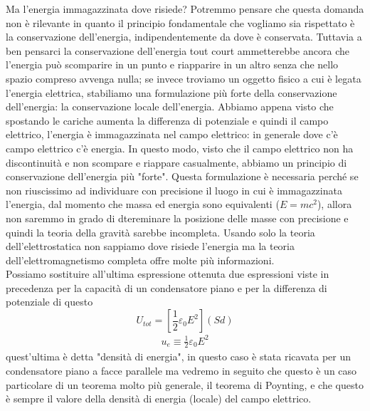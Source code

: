 \documentclass[
10pt, %
a4paper, %
oneside, %
headinclude,footinclude, %
BCOR5mm, %
]{scrartcl}
\begin{document}
Ma l'energia immagazzinata dove risiede? Potremmo pensare che questa domanda non è rilevante in quanto il principio fondamentale che vogliamo sia rispettato è la conservazione dell'energia, indipendentemente da dove è conservata. Tuttavia a ben pensarci la conservazione dell'energia tout court ammetterebbe ancora che l'energia può scomparire in un punto e riapparire in un altro senza che nello spazio compreso avvenga nulla; se invece troviamo un oggetto fisico a cui è legata l'energia elettrica, stabiliamo una formulazione più forte della conservazione dell'energia: la conservazione locale dell'energia. Abbiamo appena visto che spostando le cariche aumenta la differenza di potenziale e quindi il campo elettrico, l'energia è immagazzinata nel campo elettrico: in generale dove c'è campo elettrico c'è energia. In questo modo, visto che il campo elettrico non ha discontinuità e non scompare e riappare casualmente, abbiamo un principio di conservazione dell'energia più "forte". Questa formulazione è necessaria perché se non riuscissimo ad individuare con precisione il luogo in cui è immagazzinata l'energia, dal momento che massa ed energia sono equivalenti (\(E = mc^2\)), allora non saremmo in grado di dtereminare la posizione delle masse con precisione e quindi la teoria della gravità sarebbe incompleta. Usando solo la teoria dell'elettrostatica non sappiamo dove risiede l'energia ma la teoria dell'elettromagnetismo completa offre molte più informazioni.\\
Possiamo sostituire all'ultima espressione ottenuta due espressioni viste in precedenza per la capacità di un condensatore piano e per la differenza di potenziale di questo 
\[U_{tot} = [\frac{1}{2}\varepsilon_0 E^2](Sd) \]
\begin{align}\label{eq:densità_energia_elettrica}
	u_e \equiv \frac{1}{2}\varepsilon_0 E^2
\end{align}
quest'ultima è detta "densità di energia", in questo caso è stata ricavata per un condensatore piano a facce parallele ma vedremo in seguito che questo è un caso particolare di un teorema molto più generale, il teorema di Poynting, e che questo è sempre il valore della densità di energia (locale) del campo elettrico.
\newpage
\end{document}
